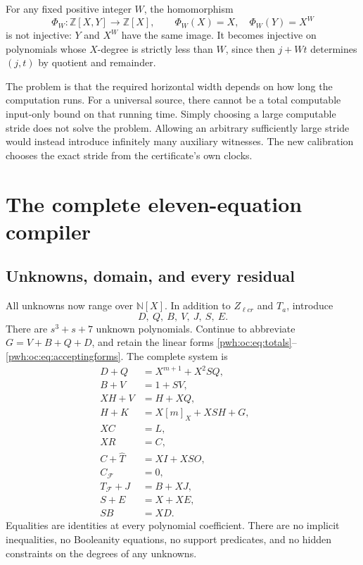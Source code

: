 \documentclass[11pt,letterpaper]{article}
\numberwithin{equation}{section}
\theoremstyle{definition}
\newcommand{\N}{\mathbb N}
\newcommand{\Z}{\mathbb Z}
\newcommand{\F}{\mathcal F}
\newcommand{\rep}[1]{[#1]_X}
\newcommand{\CF}{C_{\F}}
\newcommand{\TF}{T_{\F}}
\begin{document}
For any fixed positive integer $W$, the homomorphism
\[
 \Phi_W:\Z[X,Y]\longrightarrow\Z[X],\qquad
 \Phi_W(X)=X,\quad \Phi_W(Y)=X^W
\]
is not injective: $Y$ and $X^W$ have the same image. It becomes injective
on polynomials whose $X$-degree is strictly less than $W$, since then
$j+Wt$ determines $(j,t)$ by quotient and remainder.

The problem is that the required horizontal width depends on how long
the computation runs. For a universal source, there cannot be a total
computable input-only bound on that running time. Simply choosing a
large computable stride does not solve the problem. Allowing an arbitrary
sufficiently large stride would instead introduce infinitely many
auxiliary witnesses. The new calibration chooses the exact stride from
the certificate's own clocks.

\clearpage
\section{The complete eleven-equation compiler}
\label{pwh:oc:sec:compiler}

\subsection{Unknowns, domain, and every residual}

All unknowns now range over $\N[X]$. In addition to $Z_{\ell cr}$ and
$T_a$, introduce
\[
 D,\ Q,\ B,\ V,\ J,\ S,\ E.
\]
There are $s^3+s+7$ unknown polynomials. Continue to abbreviate
$G=V+B+Q+D$, and retain the linear forms
\eqref{pwh:oc:eq:totals}--\eqref{pwh:oc:eq:acceptingforms}. The complete system is
\begin{align}
 D+Q&=X^{m+1}+X^2SQ, &&\tag{1}\label{pwh:oc:eq:c1}\\
 B+V&=1+SV, &&\tag{2}\label{pwh:oc:eq:c2}\\
 XH+V&=H+XQ, &&\tag{3}\label{pwh:oc:eq:shapeh}\\
 H+K&=X\rep m+XSH+G, &&\tag{4}\label{pwh:oc:eq:shapek}\\
 XC&=L, &&\tag{5}\label{pwh:oc:eq:left}\\
 XR&=C, &&\tag{6}\label{pwh:oc:eq:right}\\
 C+\widehat T&=XI+XSO, &&\tag{7}\label{pwh:oc:eq:vertical}\\
 \CF&=0, &&\tag{8}\label{pwh:oc:eq:early}\\
 \TF+J&=B+XJ, &&\tag{9}\label{pwh:oc:eq:terminal}\\
 S+E&=X+XE, &&\tag{10}\label{pwh:oc:eq:stride}\\
 SB&=XD. &&\tag{11}\label{pwh:oc:eq:calibration}
\end{align}
Equalities are identities at every polynomial coefficient. There are no
implicit inequalities, no Booleanity equations, no support predicates,
and no hidden constraints on the degrees of any unknowns.
\end{document}

